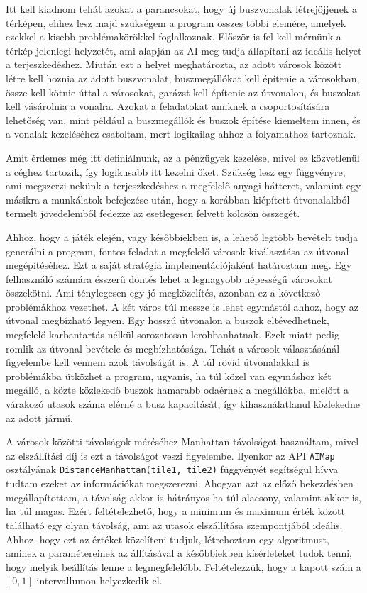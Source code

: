 \noindent Itt kell kiadnom tehát azokat a parancsokat, hogy új buszvonalak létrejöjjenek a térképen, ehhez lesz majd szükségem a program összes többi elemére, amelyek ezekkel a kisebb problémakörökkel foglalkoznak. Először is fel kell mérnünk a térkép jelenlegi helyzetét, ami alapján az AI meg tudja állapítani az ideális helyet a terjeszkedéshez. Miután ezt a helyet meghatározta, az adott városok között létre kell hoznia az adott buszvonalat, buszmegállókat kell építenie a városokban, össze kell kötnie úttal a városokat, garázst kell építenie az útvonalon, és buszokat kell vásárolnia a vonalra. Azokat a feladatokat amiknek a csoportosítására lehetőség van, mint például a buszmegállók és buszok építése kiemeltem innen, és a vonalak kezeléséhez csatoltam, mert logikailag ahhoz a folyamathoz tartoznak.

Amit érdemes még itt definiálnunk, az a pénzügyek kezelése, mivel ez közvetlenül a céghez tartozik, így logikusabb itt kezelni őket. Szükség lesz egy függvényre, ami megszerzi nekünk a terjeszkedéshez a megfelelő anyagi hátteret, valamint egy másikra a munkálatok befejezése után, hogy a korábban kiépített útvonalakból termelt jövedelemből fedezze az esetlegesen felvett kölcsön összegét.


Ahhoz, hogy a játék elején, vagy későbbiekben is, a lehető legtöbb bevételt tudja generálni a program, fontos feladat a megfelelő városok kiválasztása az útvonal megépítéséhez. Ezt a saját stratégia implementációjaként határoztam meg. Egy felhasználó számára ésszerű döntés lehet a legnagyobb népességű városokat összekötni. Ami ténylegesen egy jó megközelítés, azonban ez a következő problémákhoz vezethet. A két város túl messze is lehet egymástól ahhoz, hogy az útvonal megbízható legyen. Egy hosszú útvonalon a buszok eltévedhetnek, megfelelő karbantartás nélkül sorozatosan lerobbanhatnak. Ezek miatt pedig romlik az útvonal bevétele és megbízhatósága. Tehát a városok választásánál figyelembe kell vennem azok távolságát is. A túl rövid útvonalakkal is problémákba ütközhet a program, ugyanis, ha túl közel van egymáshoz két megálló, a közte közlekedő buszok hamarabb odaérnek a megállókba, mielőtt a várakozó utasok száma elérné a busz kapacitását, így kihasználatlanul közlekedne az adott jármű.

A városok közötti távolságok méréséhez Manhattan távolságot használtam, mivel az elszállítási díj is ezt a távolságot veszi figyelembe. Ilyenkor az API \texttt{AIMap} osztályának \texttt{DistanceManhattan(tile1, tile2)} függvényét segítségül hívva tudtam ezeket az információkat megszerezni. Ahogyan azt az előző bekezdésben megállapítottam, a távolság akkor is hátrányos ha túl alacsony, valamint akkor is, ha túl magas. Ezért feltételezhető, hogy a minimum és maximum érték között található egy olyan távolság, ami az utasok elszállítása szempontjából ideális. Ahhoz, hogy ezt az értéket közelíteni tudjuk, létrehoztam egy algoritmust, aminek a paramétereinek az állításával a későbbiekben kísérleteket tudok tenni, hogy melyik beállítás lenne a legmegfelelőbb. Feltételezzük, hogy a kapott szám a $[0, 1]$ intervallumon helyezkedik el.

